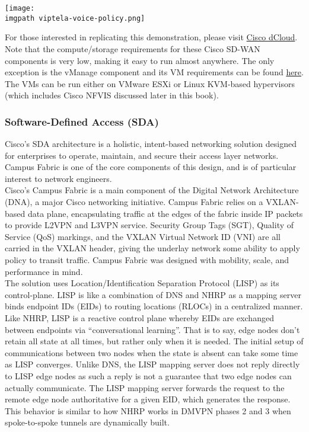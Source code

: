     \begin{minipage}[t]{\linewidth}
	  \centering
      \texttt{[image: \\imgpath viptela-voice-policy.png]}
    \end{minipage}

For those interested in replicating this demonstration, please visit
\href{https://dcloud.cisco.com/}{Cisco dCloud}.
Note that the compute/storage requirements for these Cisco SD-WAN components
is very low, making it easy to run almost anywhere. The only exception is the
vManage component and its VM requirements can be found
\href{https://sdwan-docs.cisco.com/Product_Documentation/Getting_Started/
Hardware_and_Software_Installation/Server_Hardware_Recommendations}{here}.
The VMs can be run either on VMware ESXi or Linux KVM-based hypervisors (which
includes Cisco NFVIS discussed later in this book).

\subsubsection{Software-Defined Access (SDA)}
Cisco's SDA architecture is a holistic, intent-based networking solution
designed for enterprises to operate, maintain, and secure their access layer
networks. Campus Fabric is one of the core components of this design, and is
of particular interest to network engineers. \\

Cisco’s Campus Fabric is a main component of the Digital Network Architecture
(DNA), a major Cisco networking initiative. Campus Fabric relies on a
VXLAN-based data plane, encapsulating traffic at the edges of the fabric
inside IP packets to provide L2VPN and L3VPN service. Security Group Tags
(SGT), Quality of Service (QoS) markings, and the VXLAN Virtual Network ID
(VNI) are all carried in the VXLAN header, giving the underlay network some
ability to apply policy to transit traffic. Campus Fabric was designed with
mobility, scale, and performance in mind. \\

The solution uses Location/Identification Separation Protocol (LISP) as its
control-plane. LISP is like a combination of DNS and NHRP as a mapping server
binds endpoint IDs (EIDs) to routing locations (RLOCs) in a centralized
manner. Like NHRP, LISP is a reactive control plane whereby EIDs are exchanged
between endpoints via ``conversational learning''. That is to say, edge nodes
don’t retain all state at all times, but rather only when it is needed. The
initial setup of communications between two nodes when the state is absent can
take some time as LISP converges. Unlike DNS, the LISP mapping server does not
reply directly to LISP edge nodes as such a reply is not a guarantee that two
edge nodes can actually communicate. The LISP mapping server forwards the
request to the remote edge node authoritative for a given EID, which generates
the response. This behavior is similar to how NHRP works in DMVPN phases 2 and
3 when spoke-to-spoke tunnels are dynamically built. \\

